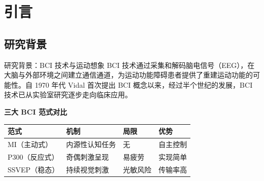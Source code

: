 
\section{引言}

\subsection{研究背景}

\begin{frame}{研究背景：BCI 技术与运动想象}
    BCI 技术通过采集和解码脑电信号（EEG），在大脑与外部环境之间建立通信通道，为运动功能障碍患者提供了重建运动功能的可能性\cite{tangermann2012review}。自 1970 年代 Vidal 首次提出 BCI 概念以来\cite{vidal1973toward}，经过半个世纪的发展，BCI 技术已从实验室研究逐步走向临床应用。
    
    \vspace{0.3cm}
    \textbf{三大 BCI 范式对比}
    \renewcommand{\arraystretch}{1.3}
    \begin{tabular}{l|l|l|l}
        \hline
        \textbf{范式} & \textbf{机制} & \textbf{局限} & \textbf{优势} \\
        \hline
        MI（主动式） & 内源性认知任务 & 无 & 自主控制 \\
        P300（反应式） & 奇偶刺激呈现 & 易疲劳 & 实现简单 \\
        SSVEP（稳态） & 持续视觉刺激 & 光敏风险 & 传输率高 \\
        \hline
    \end{tabular}
\end{frame}

